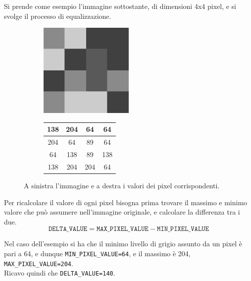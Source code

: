 \documentclass[11pt]{article}
\begin{document}
    Si prende come esempio l'immagine sottostante, di dimensioni 4x4 pixel, e si svolge il processo di equalizzazione.
    
    \renewcommand{\arraystretch}{1.9}
    \begin{figure}[h]
        \centering
        \begin{subfigure}{0.45\textwidth}
            \centering
            \includegraphics[width=0.5\textwidth]{example-small.png}
        \end{subfigure}
        \begin{subfigure}{0.45\textwidth}
            \centering
            \begin{tabular}{ |c|c|c|c| }
                \hline
                138 & 204 & 64 & 64\\
                \hline
                204 & 64 & 89 & 64\\
                \hline
                64 & 138 & 89 & 138\\
                \hline
                138 & 204 & 204 & 64\\
                \hline
            \end{tabular}
        \end{subfigure}
        
        \caption{A sinistra l'immagine e a destra i valori dei pixel corrispondenti.}
    
    \end{figure}
    
    Per ricalcolare il valore di ogni pixel bisogna prima trovare il massimo e minimo valore che può assumere nell'immagine originale, e calcolare la differenza tra i due.\\
    $$\mathtt{
    DELTA\_VALUE = MAX\_PIXEL\_VALUE - MIN\_PIXEL\_VALUE
    }$$
    
    Nel caso dell'esempio si ha che il minimo livello di grigio assunto da un pixel è pari a 64, e dunque \texttt{MIN\_PIXEL\_VALUE=64}, e il massimo è 204, \texttt{MAX\_PIXEL\_VALUE=204}.\\
    Ricavo quindi che \texttt{DELTA\_VALUE=140}.
    
\end{document}
